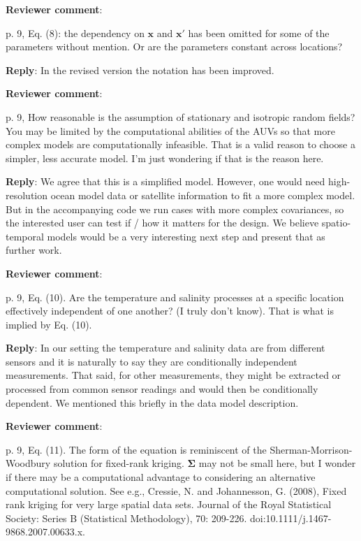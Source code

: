 \documentclass[a4paper]{article}
\newcommand{\bx}{ {\boldsymbol x} }
\newcommand{\bSigma}{ {\boldsymbol \Sigma} }
\def\revcom{\textbf{Reviewer comment}}
\def\reply{\textbf{Reply}}
\begin{document}
\begin{answers}
\begin{itemize}[noitemsep,topsep=0pt,parsep=0pt,partopsep=0pt]
\end{itemize}

\item{\revcom :}\label{r2c2}

p. 9, Eq. (8): the dependency on $\bx$ and $\bx'$ has been omitted for some of the parameters without mention. Or are the parameters constant across locations?

\reply: In the revised version the notation has been improved. 

\item{\revcom :}\label{r2c3}

p. 9, How reasonable is the assumption of stationary and isotropic random fields? You may be limited by the computational abilities of the AUVs so that more complex models are computationally infeasible. That is a valid reason to choose a simpler, less accurate model. I’m just wondering if that is the reason here. 

\reply: We agree that this is a simplified model. However, one would need high-resolution ocean model data or satellite information to fit a more complex model. But in the accompanying code we run cases with more complex covariances, so the interested user can test if / how it matters for the design. We believe spatio-temporal models would be a very interesting next step and present that as further work.

\item{\revcom  :}\label{r2c4}

p. 9, Eq. (10). Are the temperature and salinity processes at a specific location effectively independent of one another? (I truly don’t know). That is what is implied by Eq. (10).

\reply: In our setting the temperature and salinity data are from different sensors and it is naturally to say they are conditionally independent measurements. That said, for other measurements, they might be extracted or processed from common sensor readings and would then be conditionally dependent. We mentioned this briefly in the data model description.

\item{\revcom :}\label{r2c5}

p. 9, Eq. (11). The form of the equation is reminiscent of the Sherman-Morrison-Woodbury solution for fixed-rank kriging. $\bSigma$ may not be small here, but I wonder if there may be a computational advantage to considering an alternative computational solution.  See e.g., Cressie, N. and Johannesson, G. (2008), Fixed rank kriging for very large spatial data sets. Journal of the Royal Statistical Society: Series B (Statistical Methodology), 70: 209-226. doi:10.1111/j.1467-9868.2007.00633.x.


\end{answers}
\end{document}
